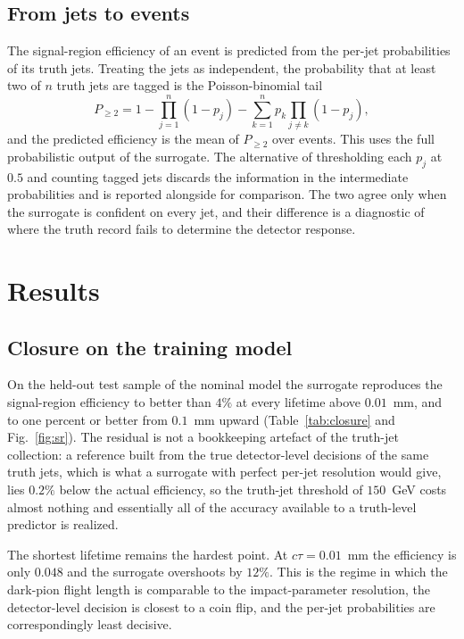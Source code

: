 \documentclass[a4paper,11pt]{article}
\newcommand{\ctau}{c\tau}
\begin{document}
\subsection{From jets to events}

The signal-region efficiency of an event is predicted from the per-jet
probabilities of its truth jets. Treating the jets as independent, the
probability that at least two of $n$ truth jets are tagged is the
Poisson-binomial tail
\begin{equation}
  P_{\geq 2} = 1 - \prod_{j=1}^{n}(1 - p_j)
             - \sum_{k=1}^{n} p_k \prod_{j \neq k}(1 - p_j),
  \label{eq:pb}
\end{equation}
and the predicted efficiency is the mean of $P_{\geq 2}$ over events.
This uses the full probabilistic output of the surrogate. The
alternative of thresholding each $p_j$ at $0.5$ and counting tagged
jets discards the information in the intermediate probabilities and
is reported alongside for comparison. The two agree only when the
surrogate is confident on every jet, and their difference is a
diagnostic of where the truth record fails to determine the detector
response.

\section{Results}
\label{sec:results}

\subsection{Closure on the training model}

On the held-out test sample of the nominal model the surrogate
reproduces the signal-region efficiency to better than $4\%$ at every
lifetime above $0.01$~mm, and to one percent or better from $0.1$~mm
upward (Table~\ref{tab:closure} and Fig.~\ref{fig:sr}). The residual
is not a bookkeeping artefact of the truth-jet collection: a reference
built from the true detector-level decisions of the same truth jets,
which is what a surrogate with perfect per-jet resolution would give,
lies $0.2\%$ below the actual efficiency, so the truth-jet threshold
of $150$~GeV costs almost nothing and essentially all of the accuracy
available to a truth-level predictor is realized.

The shortest lifetime remains the hardest point. At
$\ctau = 0.01$~mm the efficiency is only $0.048$ and the surrogate
overshoots by $12\%$. This is the regime in which the dark-pion flight
length is comparable to the impact-parameter resolution, the
detector-level decision is closest to a coin flip, and the per-jet
probabilities are correspondingly least decisive.
\end{document}
